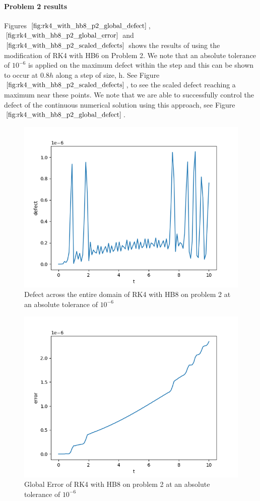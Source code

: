 \documentclass{article}
\begin{document}
\paragraph{Problem 2 results}
Figures $\ref{fig:rk4_with_hb8_p2_global_defect}$, $\ref{fig:rk4_with_hb8_p2_global_error}$ and $\ref{fig:rk4_with_hb8_p2_scaled_defects}$ shows the results of using the modification of RK4 with HB6 on Problem 2. We note that an absolute tolerance of $10^{-6}$ is applied on the maximum defect within the step and this can be shown to occur at $0.8h$ along a step of size, h. See Figure $\ref{fig:rk4_with_hb8_p2_scaled_defects}$, to see the scaled defect reaching a maximum near these points. We note that we are able to successfully control the defect of the continuous numerical solution using this approach, see Figure $\ref{fig:rk4_with_hb8_p2_global_defect}$. 

\begin{figure}[H]
\centering
\includegraphics[width=0.7\linewidth]{./figures/rk4_with_hb8_p2_global_defect}
\caption{Defect across the entire domain of RK4 with HB8 on problem 2 at an absolute tolerance of $10^{-6}$}
\label{fig:rk4_with_hb8_p2_global_defect}
\end{figure}

\begin{figure}[H]
\centering
\includegraphics[width=0.7\linewidth]{./figures/rk4_with_hb8_p2_global_error}
\caption{Global Error of RK4 with HB8 on problem 2 at an absolute tolerance of $10^{-6}$}
\label{fig:rk4_with_hb8_p2_global_error}
\end{figure}
\end{document}
